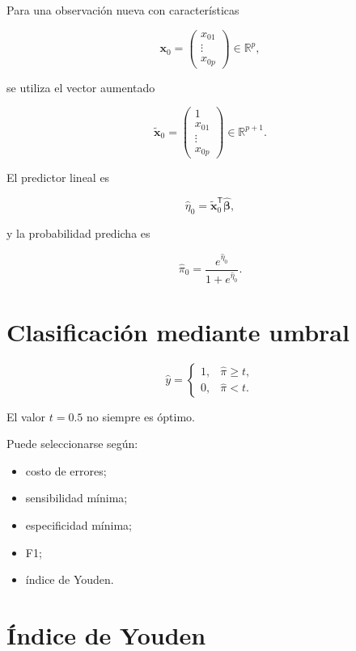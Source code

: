 \documentclass[
  spanish,
  11pt,
  letterpaper,
  DIV=11,
  numbers=noendperiod]{scrreprt}
\providecommand{\tightlist}{%
  \setlength{\itemsep}{0pt}\setlength{\parskip}{0pt}}
\theoremstyle{definition}
\theoremstyle{plain}
\theoremstyle{definition}
\theoremstyle{remark}
\begin{document}
Para una observación nueva con características

\[
\mathbf{x}_0
=
\begin{pmatrix}
x_{01}\\
\vdots\\
x_{0p}
\end{pmatrix}
\in\mathbb{R}^{p},
\]

se utiliza el vector aumentado

\[
\widetilde{\mathbf{x}}_0
=
\begin{pmatrix}
1\\
x_{01}\\
\vdots\\
x_{0p}
\end{pmatrix}
\in\mathbb{R}^{p+1}.
\]

El predictor lineal es

\[
\widehat{\eta}_0
=
\widetilde{\mathbf{x}}_0^{\mathsf T}
\widehat{\boldsymbol{\beta}},
\]

y la probabilidad predicha es

\[
\widehat{\pi}_0
=
\frac{
e^{\widehat{\eta}_0}
}{
1+e^{\widehat{\eta}_0}
}.
\]

\section{Clasificación mediante
umbral}\label{clasificaciuxf3n-mediante-umbral}

\[
\widehat{y}
=
\begin{cases}
1, & \widehat{\pi}\geq t,\\
0, & \widehat{\pi}<t.
\end{cases}
\]

El valor \(t=0.5\) no siempre es óptimo.

Puede seleccionarse según:

\begin{itemize}
\tightlist
\item
  costo de errores;
\item
  sensibilidad mínima;
\item
  especificidad mínima;
\item
  F1;
\item
  índice de Youden.
\end{itemize}

\section{Índice de Youden}\label{uxedndice-de-youden}
\end{document}
